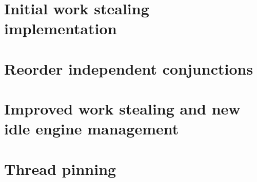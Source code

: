

\section{Initial work stealing implementation}
\label{sec:rts_work_stealing}



\section{Reorder independent conjunctions}
\label{sec:rts_reorder}



\section{Improved work stealing and new idle engine management}
\label{sec:rts_work_stealing2}



\section{Thread pinning}
\label{sec:rts_thread_pinning}



%

